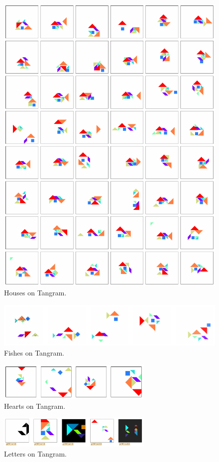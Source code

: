 \begin{figure}[h]
    \centering
    \includegraphics[width=\textwidth]{images/curation_house.pdf}
    \caption{Houses on Tangram.}
    \label{fig:curation_house}
\end{figure}

\begin{figure}[h]
    \centering
    \includegraphics[width=\textwidth]{images/curation_fish.pdf}
    \caption{Fishes on Tangram.}
    \label{fig:curation_fish}
\end{figure}

\begin{figure}[h]
    \centering
    \includegraphics[width=0.66\textwidth]{images/curation_heart.pdf}
    \caption{Hearts on Tangram.}
    \label{fig:curation_heart}
\end{figure}

\begin{figure}[h]
    \centering
    \includegraphics[width=0.66\textwidth]{images/curation_letters.pdf}
    \caption{Letters on Tangram.}
    \label{fig:curation_letters}
\end{figure}
